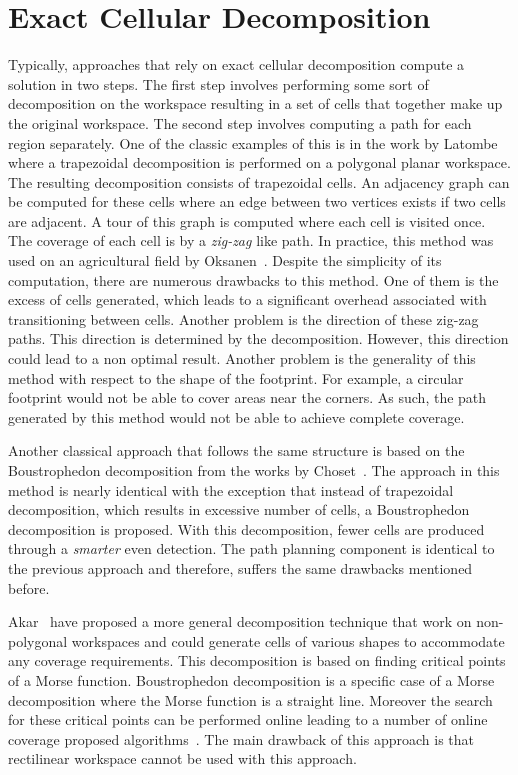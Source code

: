 \documentclass[../main.tex]{subfiles}
\begin{document}
\section{Exact Cellular Decomposition}
\label{section:exact_cellular_decomposition}

Typically, approaches that rely on exact cellular decomposition compute a solution in two steps. The first step involves performing some sort of decomposition on the workspace resulting in a set of cells that together make up the original workspace. The second step involves computing a path for each region separately. One of the classic examples of this is in the work by Latombe~\cite{latombe1991exact} where a trapezoidal decomposition is performed on a polygonal planar workspace. The resulting decomposition consists of trapezoidal cells. An adjacency graph can be computed for these cells where an edge between two vertices exists if two cells are adjacent. A tour of this graph is computed where each cell is visited once. The coverage of each cell is by a \emph{zig-zag} like path.  In practice, this method was used on an agricultural field by Oksanen~\cite{Oksanen2009coverage}. Despite the simplicity of its computation, there are numerous drawbacks to this method. One of them is the excess of cells generated, which leads to a significant overhead associated with transitioning between cells. Another problem is the direction of these zig-zag paths. This direction is determined by the decomposition. However, this direction could lead to a non optimal result. Another problem is the generality of this method with respect to the shape of the footprint. For example, a circular footprint would not be able to cover areas near the corners. As such, the path generated by this method would not be able to achieve complete coverage.

Another classical approach that follows the same structure is based on the Boustrophedon decomposition from the works by Choset~\cite{choset2000coverage}. The approach in this method is nearly identical with the exception that instead of trapezoidal decomposition, which results in excessive number of cells, a Boustrophedon decomposition is proposed. With this decomposition, fewer cells are produced through a \emph{smarter} even detection. The path planning component is identical to the previous approach and therefore, suffers the same drawbacks mentioned before.

Akar~\cite{Acar2002morse} have proposed a more general decomposition technique that work on non-polygonal workspaces and could generate cells of various shapes to accommodate any coverage requirements. This decomposition is based on finding critical points of a Morse function. Boustrophedon decomposition is a specific case of a Morse decomposition where the Morse function is a straight line. Moreover the search for these critical points can be performed online leading to a number of online coverage proposed algorithms~\cite{acar2002sensor}. The main drawback of this approach is that rectilinear workspace cannot be used with this approach. 
\end{document}

